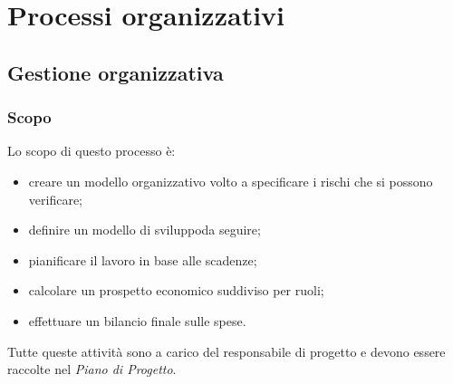 \section{Processi organizzativi}
	\subsection{Gestione organizzativa}


		
		\subsubsection{Scopo}
		Lo scopo di questo processo è:
		\begin{itemize}
			\item creare un modello organizzativo volto a specificare i rischi che si possono verificare;
			\item definire un modello di sviluppo\glosp da seguire;
			\item pianificare il lavoro in base alle scadenze;
			\item calcolare un prospetto economico suddiviso per ruoli;
			\item effettuare un bilancio finale sulle spese.
		\end{itemize}
		Tutte queste attività sono a carico del responsabile di progetto e devono essere raccolte nel \textit{Piano di Progetto}.

